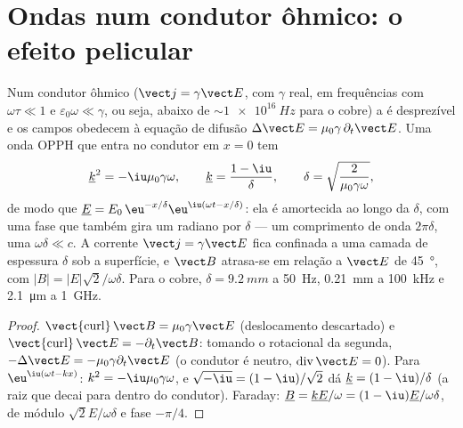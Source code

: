 \section{Ondas num condutor ôhmico: o efeito pelicular}

\begin{theorem}\label{thm:b2:waves-in-media:skin}
Num condutor ôhmico ($\vect j = \gamma\vect E$, com $\gamma$ real, em frequências
com $\omega\tau \ll 1$ e $\varepsilon_0\omega \ll \gamma$, ou seja, abaixo de $\sim\qty{1e16}{Hz}$ para o
cobre) a  é desprezível e os campos obedecem à
equação de difusão $\Delta\vect E = \mu_0\gamma\,\partial_t\vect E$. Uma onda OPPH que entra
no condutor em $x = 0$ tem
\[
\underline k^2 = -\iu\mu_0\gamma\omega , \qquad \underline k = \frac{1 - \iu}\delta , \qquad
\delta = \sqrt{\frac2{\mu_0\gamma\omega}} ,
\]
de modo que $\underline E = E_0\,\eu^{-x/\delta}\eu^{\iu(\omega t - x/\delta)}$: ela é amortecida
ao longo da \emph{} $\delta$, com uma fase que também gira um
radiano por $\delta$ --- um comprimento de onda $2\pi\delta$, uma  $\omega\delta \ll
c$. A corrente $\vect j = \gamma\vect E$ fica confinada a uma camada de espessura
$\delta$ sob a superfície, e $\vect B$ atrasa-se em relação a $\vect E$ de \qty{45}{\degree}, com
$|B| = |E|\sqrt2/\omega\delta$. Para o cobre, $\delta = \qty{9.2}{mm}$ a \qty{50}{Hz},
\qty{0.21}{mm} a \qty{100}{kHz} e \qty{2.1}{\micro m} a \qty{1}{GHz}.
\end{theorem}

\begin{proof}
$\operatorname{\vect{curl}}\vect B = \mu_0\gamma\vect E$ (deslocamento descartado) e
$\operatorname{\vect{curl}}\vect E = -\partial_t\vect B$: tomando o rotacional da segunda,
$-\Delta\vect E = -\mu_0\gamma\partial_t\vect E$ (o condutor é neutro, $\operatorname{div}
\vect E = 0$). Para $\eu^{\iu(\omega t - kx)}$: $k^2 = -\iu\mu_0\gamma\omega$, e
$\sqrt{-\iu} = (1 - \iu)/\sqrt2$ dá $\underline k = (1 - \iu)/\delta$ (a raiz que
decai para dentro do condutor). Faraday: $\underline B = \underline k\underline E/\omega = (1 - \iu)
\underline E/\omega\delta$, de módulo $\sqrt2E/\omega\delta$ e fase $-\pi/4$.
\end{proof}

